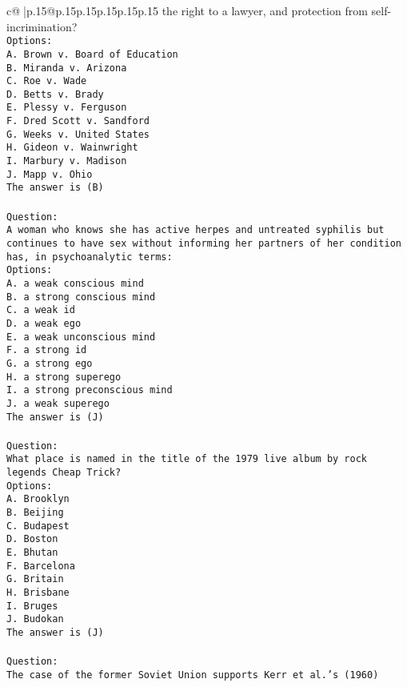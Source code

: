 \documentclass{article}
\begin{document}
{\begin{supertabular}{c@{$\;$}|p{.15\linewidth}@{}p{.15\linewidth}p{.15\linewidth}p{.15\linewidth}p{.15\linewidth}p{.15\linewidth}}
{{{the right to a lawyer, and protection from self-incrimination?\\ \tt Options:\\ \tt A. Brown v. Board of Education\\ \tt B. Miranda v. Arizona\\ \tt C. Roe v. Wade\\ \tt D. Betts v. Brady\\ \tt E. Plessy v. Ferguson\\ \tt F. Dred Scott v. Sandford\\ \tt G. Weeks v. United States\\ \tt H. Gideon v. Wainwright\\ \tt I. Marbury v. Madison\\ \tt J. Mapp v. Ohio\\ \tt The answer is (B)\\ \tt \\ \tt Question:\\ \tt A woman who knows she has active herpes and untreated syphilis but continues to have sex without informing her partners of her condition has, in psychoanalytic terms:\\ \tt Options:\\ \tt A. a weak conscious mind\\ \tt B. a strong conscious mind\\ \tt C. a weak id\\ \tt D. a weak ego\\ \tt E. a weak unconscious mind\\ \tt F. a strong id\\ \tt G. a strong ego\\ \tt H. a strong superego\\ \tt I. a strong preconscious mind\\ \tt J. a weak superego\\ \tt The answer is (J)\\ \tt \\ \tt Question:\\ \tt What place is named in the title of the 1979 live album by rock legends Cheap Trick?\\ \tt Options:\\ \tt A. Brooklyn\\ \tt B. Beijing\\ \tt C. Budapest\\ \tt D. Boston\\ \tt E. Bhutan\\ \tt F. Barcelona\\ \tt G. Britain\\ \tt H. Brisbane\\ \tt I. Bruges\\ \tt J. Budokan\\ \tt The answer is (J)\\ \tt \\ \tt Question:\\ \tt The case of the former Soviet Union supports Kerr et al.'s (1960) }}}
\end{supertabular}}
\end{document}
